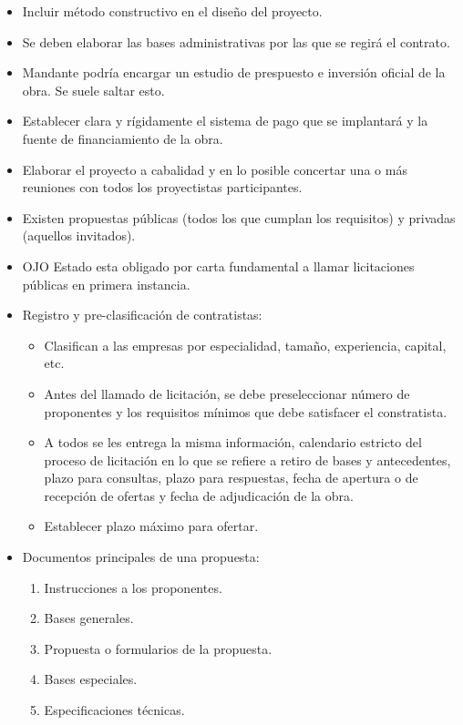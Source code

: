 \documentclass{article} %
\begin{document}
\begin{enumerate}
\begin{itemize}
        \item Incluir método constructivo en el diseño del proyecto.
        \item Se deben elaborar las bases administrativas por las que se regirá el contrato.
        \item Mandante podría encargar un estudio de prespuesto e inversión oficial de la obra. Se suele saltar esto.
        \item Establecer clara y rígidamente el sistema de pago que se implantará y la fuente de
        financiamiento de la obra.
        \item Elaborar el proyecto a cabalidad y en lo posible concertar una o más reuniones con todos
        los proyectistas participantes.
        \item Existen propuestas públicas (todos los que cumplan los requisitos) y privadas (aquellos invitados).
        \item OJO Estado esta obligado por carta fundamental a llamar licitaciones públicas en primera instancia.
        \item Registro y pre-clasificación de contratistas:
        \begin{itemize}
            \item Clasifican a las empresas por especialidad, tamaño, experiencia, capital, etc.
            \item Antes del llamado de licitación, se debe preseleccionar número de proponentes y los requisitos mínimos que debe satisfacer el constratista.
            \item A todos se les entrega la misma información, calendario estricto del proceso de licitación en lo que se refiere a retiro de
            bases y antecedentes, plazo para consultas, plazo para respuestas, fecha de apertura o de
            recepción de ofertas y fecha de adjudicación de la obra.
            \item Establecer plazo máximo para ofertar.
        \end{itemize}
        \item Documentos principales de una propuesta:
        \begin{enumerate}
            \item Instrucciones a los proponentes.
            \item Bases generales.
            \item Propuesta o formularios de la propuesta.
            \item Bases especiales.
            \item Especificaciones técnicas.

\end{enumerate}
\end{itemize}
\end{enumerate}
\end{document}
